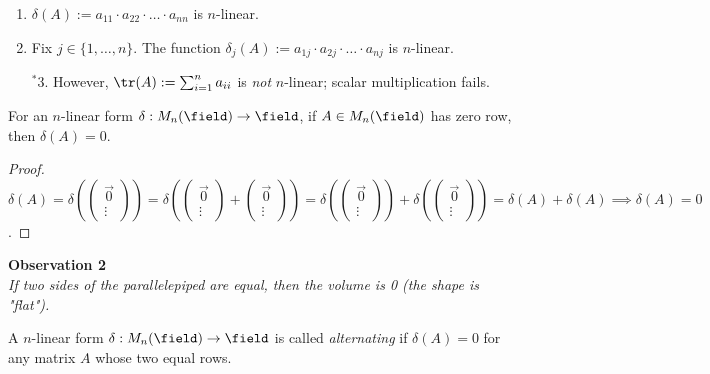 \begin{example}
    \begin{enumerate}
        \item $\delta(A) := a_{11}\cdot a_{22}\cdot \dots \cdot a_{nn}$ is $n$-linear.
        \item Fix $j \in \{1, \dots, n\}$. The function $\delta_j(A) := a_{1j}\cdot a_{2j} \cdot \dots \cdot a_{nj}$ is $n$-linear.
        \item[$^\ast 3.$] However, $\tr(A) := \sum_{i=1}^n a_{ii}$ is \emph{not} $n$-linear; scalar multiplication fails.
    \end{enumerate}
\end{example}

\begin{proposition}
    For an $n$-linear form $\delta : M_n(\field) \to \field$, if $A \in M_n(\field)$ has zero row, then $\delta(A) = 0$.
\end{proposition}

\begin{proof}
    $\delta(A) = \delta\left( \begin{pmatrix}
        \vec{0}\\
        \vdots
    \end{pmatrix}\right) = \delta\left(\begin{pmatrix}
        \vec{0}\\
        \vdots
    \end{pmatrix}+\begin{pmatrix}
        \vec{0}\\
        \vdots
    \end{pmatrix}\right) = \delta\left(\begin{pmatrix}
        \vec{0}\\
        \vdots
    \end{pmatrix}\right) + \delta\left(\begin{pmatrix}
        \vec{0}\\
        \vdots
    \end{pmatrix}\right) = \delta(A) + \delta (A) \implies \delta(A) = 0$.
\end{proof}


\begin{center}
    \textbf{Observation 2}\\
    \textit{If two sides of the parallelepiped are equal, then the volume is 0 (the shape is "flat").}
\end{center}

\begin{definition}[Alternating]
    A $n$-linear form $\delta : M_n(\field) \to \field$ is called \emph{alternating} if $\delta(A) = 0$ for any matrix $A$ whose two equal rows.
\end{definition}

